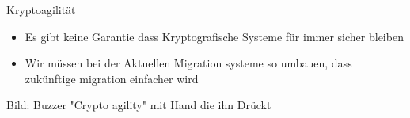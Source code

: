 


\begin{frame}[T]{Kryptoagilität}

\begin{itemize}
  \item Es gibt keine Garantie dass Kryptografische Systeme für immer sicher bleiben
  \item Wir müssen bei der Aktuellen Migration systeme so umbauen, dass zukünftige migration einfacher wird
\end{itemize}

Bild: Buzzer "Crypto agility" mit Hand die ihn Drückt

\end{frame}
